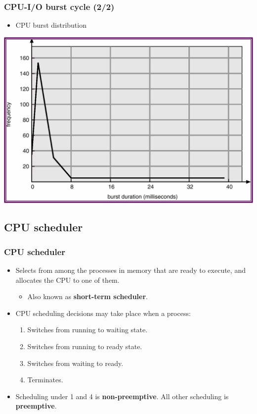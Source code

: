 \documentclass[CJKutf8,xcolor=pdftex,dvipsnames,table]{beamer}
\begin{document}
\begin{CJK*}{UTF8}{song}
  \begin{frame}
  \frametitle{CPU-I/O burst cycle (2/2)} \pause
  \begin{itemize}
  \item{CPU burst distribution} \pause
  \end{itemize}
  \begin{center}
    \includegraphics[scale=0.5]{v6f6-2}
  \end{center}
  \end{frame}
  
  \subsection{CPU scheduler}

  \begin{frame}
  \frametitle{CPU scheduler} \pause
  \begin{itemize}
  \item{Selects from among the processes in memory that are ready to execute, and allocates the CPU to one of them.} \pause
    \begin{itemize}
    \item{Also known as \textbf{short-term scheduler}.} \pause
    \end{itemize}
  \item{CPU scheduling decisions may take place when a process:} \pause
    \begin{enumerate}
    \item{Switches from running to waiting state.} \pause
    \item{Switches from running to ready state.} \pause
    \item{Switches from waiting to ready.} \pause
    \item{Terminates.} \pause
    \end{enumerate}
  \item{Scheduling under 1 and 4 is \textbf{non-preemptive}. All other scheduling is \textbf{preemptive}.}
  \end{itemize}
  \end{frame}
  

\end{CJK*}
\end{document}
